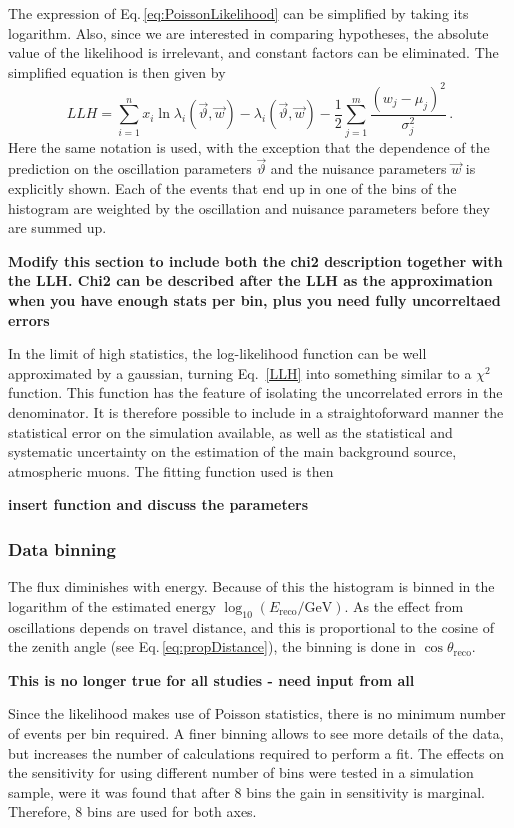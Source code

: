 \documentclass[../Main.tex]{subfiles}
\begin{document}
The expression of Eq.\,\ref{eq:PoissonLikelihood} can be simplified by taking its logarithm. Also, since we are interested in comparing hypotheses, the absolute value of the likelihood is irrelevant, and constant factors can be eliminated. The simplified equation is then given by
\begin{equation}
LLH = \sum_{i=1}^n x_i \ln \lambda_i(\vec{\vartheta}, \vec{w}) - \lambda_i(\vec{\vartheta},\vec{w}) - \frac{1}{2} \sum_{j=1}^m  \frac{(w_j - \mu_j)^2}{\sigma^2_j}\,.
\label{eq:LLH}
\end{equation}
Here the same notation is used, with the exception that the dependence of the prediction on the oscillation parameters $\vec{\vartheta}$ and the nuisance parameters $\vec{w}$ is explicitly shown. Each of the events that end up in one of the bins of the histogram are weighted by the oscillation and nuisance parameters before they are summed up.

\textbf{Modify this section to include both the chi2 description together with the LLH. Chi2 can be described after the LLH as the approximation when you have enough stats per bin, plus you need fully uncorreltaed errors}

In the limit of high statistics, the log-likelihood function can be well approximated by a gaussian, turning Eq.~\ref{LLH} into something similar to a $\chi^2$ function. This function has the feature of isolating the uncorrelated errors in the denominator. It is therefore possible to include in a straightoforward manner the statistical error on the simulation available, as well as the statistical and systematic uncertainty on the estimation of the main background source, atmospheric muons. The fitting function used is then

\textbf{insert function and discuss the parameters}

\subsubsection{Data binning}
The flux diminishes with energy. Because of this the histogram is binned in the logarithm of the estimated energy $\log_{10}(E_\mathrm{reco}/\mathrm{GeV})$. As the effect from oscillations depends on travel distance, and this is proportional to the cosine of the zenith angle (see Eq.\,\ref{eq:propDistance}), the binning is done in $\cos\theta_\mathrm{reco}$.


\textbf{This is no longer true for all studies - need input from all}

Since the likelihood makes use of Poisson statistics, there is no minimum number of events per bin required. A finer binning allows to see more details of the data, but increases the number of calculations required to perform a fit. The effects on the sensitivity for using different number of bins were tested in a simulation sample, were it was found that after 8 bins the gain in sensitivity is marginal. Therefore, 8 bins are used for both axes.
\end{document}
